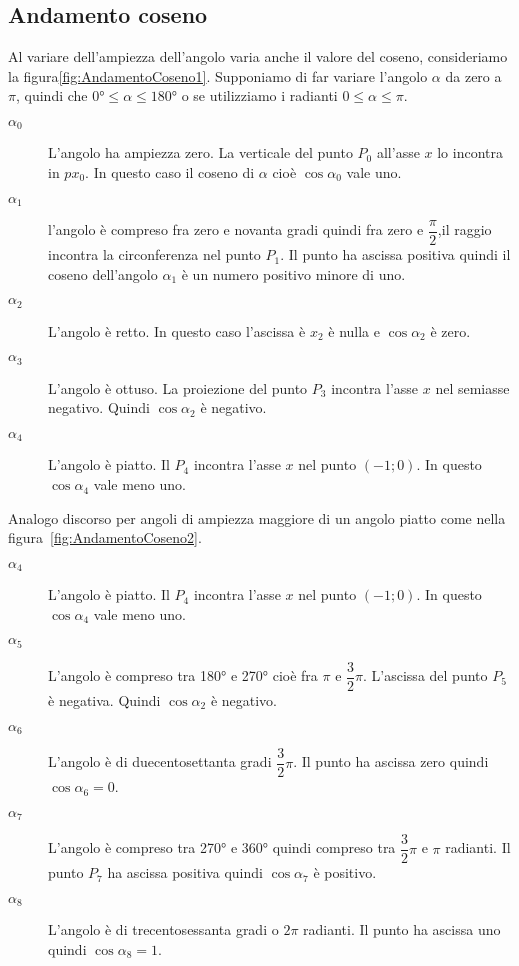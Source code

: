 \subsection{Andamento coseno}
\label{sec:andamentocoseno}
Al variare dell'ampiezza dell'angolo varia anche il valore del coseno, consideriamo la figura\nobs\vref{fig:AndamentoCoseno1}. Supponiamo di far variare l'angolo $\alpha$ da zero a $\pi$, quindi che $\ang{0}\leq\alpha\leq\ang{180}$ o se utilizziamo i radianti $\num{0}\leq\alpha\leq\pi$. 
\begin{description}
	\item[$\alpha_0$] L'angolo ha ampiezza zero. La verticale del punto $P_0$ all'asse $x$ lo incontra in $px_0$. In questo caso il coseno di $\alpha$ cioè $\cos\alpha_0$ vale uno.
	\item [$\alpha_1$] l'angolo è compreso fra zero e novanta gradi quindi fra zero e $\dfrac{\pi}{2} $,il raggio incontra la circonferenza nel punto $P_1$. Il punto ha ascissa positiva quindi il coseno dell'angolo $\alpha_1$ è un numero positivo minore di uno.
	\item [$\alpha_2$] L'angolo  è retto. In questo caso l'ascissa è $x_2$ è   nulla e $\cos\alpha_2$ è zero. 
	\item [$\alpha_3$]  L'angolo è ottuso. La proiezione del punto $P_3$ incontra  l'asse $x$ nel semiasse negativo. Quindi $\cos\alpha_2$ è negativo.
	\item [$\alpha_4$] L'angolo  è  piatto. Il  $P_4$ incontra l'asse $x$ nel punto $(-1;0)$. In questo  $\cos\alpha_4$ vale meno uno.
\end{description}
\begin{figure}
	\centering
	
	\label{fig:circonferenzagonimetricagonio}
\end{figure}
Analogo discorso per angoli di ampiezza  maggiore di un angolo  piatto come nella figura~\vref{fig:AndamentoCoseno2}.
\begin{description}
	\item [$\alpha_4$] L'angolo è piatto. Il  $P_4$ incontra l'asse $x$ nel punto $(-1;0)$. In questo  $\cos\alpha_4$ vale meno uno.
	\item [$\alpha_5$] L'angolo è compreso tra \ang{180} e \ang{270} cioè fra $\pi$ e $\dfrac{3}{2}\pi$. L'ascissa del punto  $P_5$ è negativa. Quindi $\cos\alpha_2$ è negativo.
	\item [$\alpha_6$] L'angolo è di duecentosettanta gradi $\dfrac{3}{2}\pi$. Il punto ha ascissa zero quindi  $\cos\alpha_6=0$.
	\item [$\alpha_7$] L'angolo è compreso tra \ang{270} e \ang{360} quindi compreso tra $\dfrac{3}{2}\pi$ e $\pi$ radianti. Il punto $P_7$ ha ascissa positiva quindi $\cos\alpha_7$ è positivo.
	\item [$\alpha_8$] L'angolo è di trecentosessanta gradi o $2\pi$ radianti. Il punto ha ascissa uno quindi  $\cos\alpha_8=1$.
\end{description}

